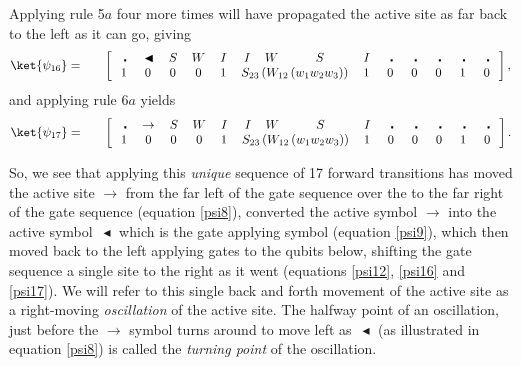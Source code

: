 \documentclass[11pt,letterpaper]{article}
\newcommand{\<}{\langle}
\renewcommand{\>}{\rangle}
\newcommand{\gat}{\,\blacktriangleleft}  %
\newcommand{\bul}{\:\:\centerdot\:}       %
\newcommand{\iga}{\:I\,}                  %
\newcommand{\wga}{W}						%
\newcommand{\sga}{\:S\,}					%
\begin{document}
Applying rule 5$a$ four more times will have propagated the active site as far back to the left as it can go, giving
\begin{eqnarray}
	\ket{\psi_{16}} &=& \quad \left[ \begin{array}{cccccccccccccc}
		\bul & \gat & \sga & \wga & \iga & \iga & 
		\wga & \sga & \iga & 
		\bul & \bul & \bul & \bul & \bul 
		\\		
		1    & 0    & 0    & 0    & 1    & 
		\multicolumn{3}{c}{S_{23}\left(W_{12}\left(w_1w_2w_3\right)\right)}
		 &
		1    & 0    & 0    & 0    & 1	& 0	
 	\end{array} \right], \label{psi16}
\end{eqnarray}
and applying rule 6$a$ yields
\begin{eqnarray}
	\ket{\psi_{17}} &=& \quad \left[ \begin{array}{cccccccccccccc}
		\bul & \rightarrow & \sga & \wga & \iga & \iga & 
		\wga & \sga & \iga & 
		\bul & \bul & \bul & \bul & \bul 
		\\		
		1    & 0    & 0    & 0    & 1    & 
		\multicolumn{3}{c}{S_{23}\left(W_{12}\left(w_1w_2w_3\right)\right)}
		 &
		1    & 0    & 0    & 0    & 1	& 0	
 	\end{array} \right]. \label{psi17}
\end{eqnarray}


So, we see that applying this \emph{unique} sequence of 17 forward transitions has moved the active site $\rightarrow$ from the far left of the gate sequence over the to the far right of the gate sequence (equation \ref{psi8}), converted the active symbol $\rightarrow$ into the active symbol $\gat$ which is the gate applying symbol (equation \ref{psi9}), which then moved back to the left applying gates to the qubits below, shifting the gate sequence a single site to the right as it went (equations \ref{psi12}, \ref{psi16} and \ref{psi17}). We will refer to this single back and forth movement of the active site as a right-moving \emph{oscillation} of the active site. The halfway point of an oscillation, just before the $\rightarrow$ symbol turns around to move left as $\gat$ (as illustrated in equation \ref{psi8}) is called the \emph{turning point} of the oscillation. 
\end{document}
